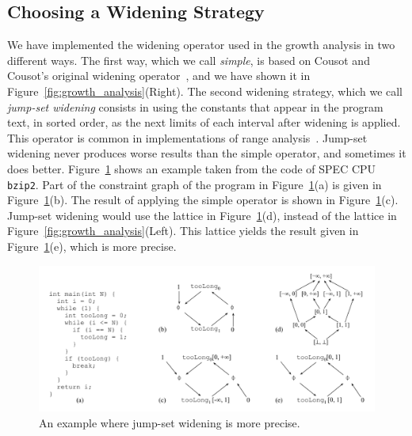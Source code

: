 \documentclass[preprint]{elsarticle}
\begin{document}
\subsection{Choosing a Widening Strategy}
\label{sub:widen}

We have implemented the widening operator used in the growth analysis in
two different ways.
The first way, which we call {\em simple}, is based on Cousot and
Cousot's original widening operator~\cite{Cousot77}, and we have shown it
in Figure~\ref{fig:growth_analysis}(Right).
The second widening strategy, which we call {\em jump-set widening} consists
in using the constants that appear in the program text, in sorted order, as
the next limits of each interval after widening is applied.
This operator is common in implementations of range
analysis~\cite[p.228]{Nielson99}.
Jump-set widening never produces worse results than the simple operator, and
sometimes it does better.
Figure~\ref{fig:jumpSet} shows an example taken from the code of
SPEC CPU \texttt{bzip2}.
Part of the constraint graph of the program in Figure~\ref{fig:jumpSet}(a)
is given in Figure~\ref{fig:jumpSet}(b).
The result of applying the simple operator is shown in
Figure~\ref{fig:jumpSet}(c).
Jump-set widening would use the lattice in Figure~\ref{fig:jumpSet}(d),
instead of the lattice in Figure~\ref{fig:growth_analysis}(Left).
This lattice yields the result given in Figure~\ref{fig:jumpSet}(e),
which is more precise.

\begin{figure}[t!]
\begin{center}
\includegraphics[width=1\textwidth]{images/jumpSet}
\end{center}
\caption{\label{fig:jumpSet}
An example where jump-set widening is more precise.}
\end{figure}
\end{document}
